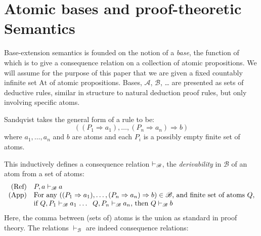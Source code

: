 \documentclass{sn-jnl}
\newcommand{\At}{\text{At}}
\newcommand{\derives}[1]{\vdash_{\!#1}}
\newcommand{\base}[1]{\mathscr{#1}}
\newcommand{\note}[1]{\textcolor{red} {[DP-Note: {#1}]}}
\renewcommand{\derives}[2]{\vdash_{\base{#1}}#2}
\begin{document}
\section{Atomic bases and proof-theoretic Semantics}\label{sec:PtSbasics}




Base-extension semantics is founded on the notion of a \emph{base}, the function of which is to give a consequence relation on a collection of atomic propositions. We will assume for the purpose of this paper that we are given a fixed countably infinite set $\At$ of atomic propositions. Bases, $\base{A}$, $\base{B}$, \dots \;  are presented as sets of deductive rules, similar in structure to natural deduction proof rules, but only involving specific atoms. 








Sandqvist \cite{Sandqvist2015base} takes the general form of a rule to be:
\[
((P_1 \Rightarrow a_1),\dots,(P_n \Rightarrow a_n) 
    \Rightarrow b)
\]
where $a_1 , \dots , a_n$ and $b$ are atoms and each 
$P_i$ is a possibly empty finite set of atoms. 

This inductively defines a consequence relation $\derives{B}$, the \emph{derivability} in $\base{B}$ of an atom from a set of atoms: 
\[
    \begin{array}{rl}%
    (\mbox{{Ref}}) & P , a \derives{B} a \\ 
    (\mbox{{App}}) & \mbox{For any $((P_1 \Rightarrow a_1),\dots,(P_n \Rightarrow a_n) \Rightarrow b)\in \base{B}$, and finite set of atoms $Q$,} \\ 
    & \mbox{if $Q , P_1 \derives{B} a_1$ \dots\, $Q , P_n \derives{B} a_n$, then $Q \derives{B} b$}
    \end{array}
\] 
Here, the comma between (sets of) atoms is the union as standard in proof theory.
The relations $\derives{B}{}$ are indeed consequence relations: 

\smallskip 
\end{document}
